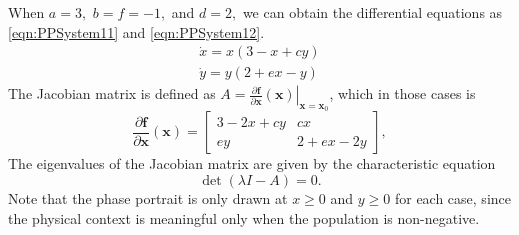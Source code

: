 When $a=3,$ $b=f=-1,$ and $d=2,$ we can obtain the differential equations as  \eqref{eqn:PPSystem11} and \eqref{eqn:PPSystem12}.
\begin{subequations}\label{eqn:PPSystem1}
\begin{align}
    \dot{x} = x(3-x+cy) \label{eqn:PPSystem11} \\
    \dot{y} = y(2+ex-y) \label{eqn:PPSystem12}
\end{align}
\end{subequations}
The Jacobian matrix is defined as $A = \left. \frac{\partial\textbf{f}}{\partial \textbf{x}}(\textbf{x}) \right|_{\textbf{x}=\textbf{x}_0}$, which in those cases is
\begin{equation*}
    \frac{\partial\textbf{f}}{\partial \textbf{x}}(\textbf{x}) =
    \left[\begin{array}{cc}
    3-2x+cy & cx \\
    ey & 2+ex-2y
    \end{array}\right],
\end{equation*}
The eigenvalues of the Jacobian matrix are given by the characteristic equation
\begin{equation*}
    \det(\lambda I - A) = 0.
\end{equation*}
Note that the phase portrait is only drawn at $x\geq0$ and $y\geq0$ for each case, since the physical context is meaningful only when the population is non-negative.
